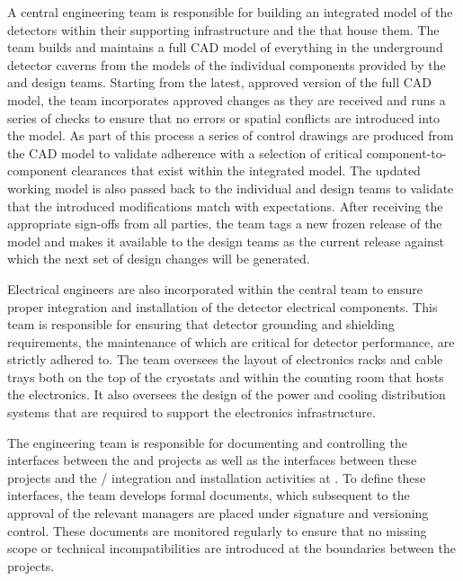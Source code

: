 A central  engineering team is responsible for building an
integrated model of the detectors within their supporting
infrastructure and the  that house them.  The
team builds and maintains a full \threed CAD model of everything in the
underground detector caverns from the models of the individual
components provided by the  and  design teams.
Starting from the latest, approved version of the full CAD model, the
 team incorporates approved changes as they are received
and runs a series of checks to ensure that no errors or spatial
conflicts are introduced into the model.  As part of this process a
series of \twod control drawings are produced from the \threed CAD model to
validate adherence with a selection of critical component-to-component
clearances that exist within the integrated model.  The updated
working model is also passed back to the individual  and
 design teams to validate that the introduced
modifications match with expectations.  After receiving the
appropriate sign-offs from all parties, the  team tags a
new frozen release of the model and makes it available to the design
teams as the current release against which the next set of design
changes will be generated.

Electrical engineers are also incorporated within the central
 team to ensure proper integration and installation of the
detector electrical components.  This team is responsible for ensuring
that detector grounding and shielding requirements, the maintenance of
which are critical for detector performance, are strictly adhered to.
The team oversees the layout of electronics racks and cable trays both
on the top of the cryostats and within the  counting room
that hosts the  electronics.  It also oversees the design of the
power and cooling distribution systems that are required to support
the electronics infrastructure.

The  engineering team is responsible for documenting and
controlling the interfaces between the  and  projects as well
as the interfaces between these projects and the / integration
and installation activities at .  To define these interfaces, the
 team develops formal documents, which subsequent to the approval
of the relevant managers are placed under signature and versioning
control.  These documents are monitored regularly to ensure that no
missing scope or technical incompatibilities are introduced at the
boundaries between the projects.


